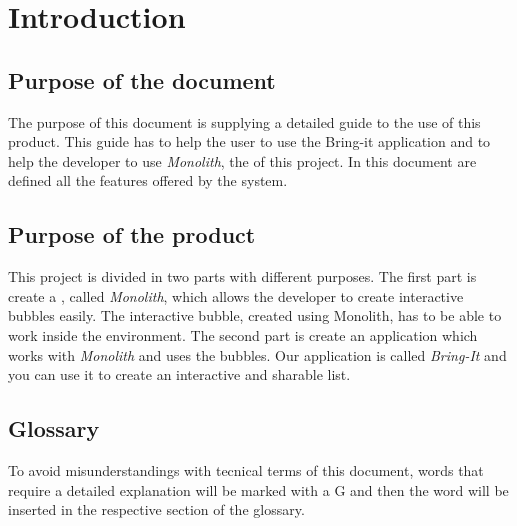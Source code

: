 \section{Introduction}

\subsection{Purpose of the document}
The purpose of this document is supplying a detailed guide to the use of this product. This guide has to help the user to use the Bring-it application and to help the developer to use \textit{Monolith}, the  of this project. In this document are defined all the features offered by the system.

\subsection{Purpose of the product}
This project is divided in two parts with different purposes. The first part is create a , called \textit{Monolith}, which allows the developer to create interactive bubbles easily. The interactive bubble, created using Monolith, has to be able to
work inside the  environment.
The second part is create an application which works with \textit{Monolith} and uses the bubbles. Our application is called \textit{Bring-It} and you can use it to create an interactive and sharable list.

\subsection{Glossary}
To avoid misunderstandings with tecnical terms of this document, words that require a detailed explanation will be marked with a G and then the word will be inserted in the respective section of the glossary.

\newpage